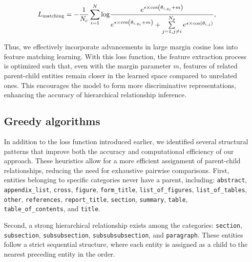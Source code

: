 \begin{equation}
\label{eq:loss}
\small
    L_{\text{matching}}=-\frac{1}{N_c}\sum\limits_{i=1}^{N}{\log }\frac{ e^{ s \times \cos\left( \theta_{i,y_i} + m \right) }}{e^{ s \times \cos\left( \theta_{i,y_i} + m \right) } + \sum\limits_{j=1, j\neq i}^{N_p}{{e}^{ s \times \cos\left( \theta_{i,j}\right) }}},
\end{equation}

Thus, we effectively incorporate advancements in large margin cosine loss into feature matching learning. With this loss function, the feature extraction process is optimized such that, even with the margin parameter \( m \), features of related parent-child entities remain closer in the learned space compared to unrelated ones. This encourages the model to form more discriminative representations, enhancing the accuracy of hierarchical relationship inference.

\subsection{Greedy algorithms}
In addition to the loss function introduced earlier, we identified several structural patterns that improve both the accuracy and computational efficiency of our approach. These heuristics allow for a more efficient assignment of parent-child relationships, reducing the need for exhaustive pairwise comparisons.
First, entities belonging to specific categories never have a parent, including:  \texttt{abstract}, \texttt{appendix\_list}, \texttt{cross}, \texttt{figure}, \texttt{form\_title}, \texttt{list\_of\_figures}, \texttt{list\_of\_tables}, \texttt{other}, \texttt{references}, \texttt{report\_title}, \texttt{section}, \texttt{summary}, \texttt{table}, \texttt{table\_of\_contents}, and \texttt{title}.

Second, a strong hierarchical relationship exists among the categories:  
\texttt{section}, \texttt{subsection}, \texttt{subsubsection}, \texttt{subsubsubsection}, and \texttt{paragraph}. These entities follow a strict sequential structure, where each entity is assigned as a child to the nearest preceding entity in the order.

